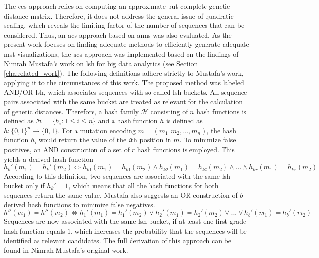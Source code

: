 The \acrshort{ccs} approach relies on computing an approximate but complete genetic distance matrix. Therefore, it does not address the general issue of quadratic scaling, which reveals the limiting factor of the number of sequences that can be considered.
Thus, an \acrfull{acs} approach based on \acrshort{anns} was also evaluated. As the present work focuses on finding adequate methods to efficiently generate adequate \acrshort{mst} visualizations, the \acrshort{acs} approach was implemented based on the findings of Nimrah Mustafa's work on \acrshort{lsh} for big data analytics (see Section \ref{cha:related_work}). The following definitions adhere strictly to Mustafa's work, applying it to the circumstances of this work. The proposed method was labeled AND/OR-\acrshort{lsh}, which associates sequences with so-called \acrshort{lsh} buckets. All sequence pairs associated with the same bucket are treated as relevant for the calculation of genetic distances. Therefore, a hash family $\mathcal{H}$ consisting of $n$ hash functions is defined as $\mathcal{H} = \{h_i: 1 \leq i \leq n\}$ and a hash function $h$ is defined as $h: \{0,1\}^n \rightarrow \{0,1\}$. For a mutation encoding $m = (m_1,m_2,...,m_n)$, the hash function $h_i$ would return the value of the $i$th position in $m$.
To minimize false positives, an AND construction of a set of $r$ hash functions is employed. This yields a derived hash function:
$$h_k'(m_1) = h_k'(m_2) \Leftrightarrow h_{k1}(m_1) = h_{k1}(m_2) \land h_{k2}(m_1) = h_{k2}(m_2) \land ... \land h_{kr}(m_1) = h_{kr}(m_2) $$
According to this definition, two sequences are associated with the same \acrshort{lsh} bucket only if $h_k' = 1$, which means that all the hash functions for both sequences return the same value. Mustafa also suggests an OR construction of $b$ derived hash functions to minimize false negatives.
$$h''(m_1) = h''(m_2) \Leftrightarrow h_{1}'(m_1) = h_{1}'(m_2) \lor h_{2}'(m_1) = h_{2}'(m_2) \lor ... \lor h_{b}'(m_1) = h_{b}'(m_2) $$
Sequences are now associated with the same \acrshort{lsh} bucket, if at least one first grade hash function equals $1$, which increases the probability that the sequences will be identified as relevant candidates. The full derivation of this approach can be found in Nimrah Mustafa's original work.

